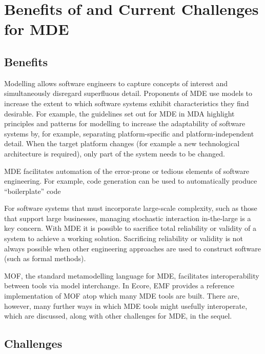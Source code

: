 
\section{Benefits of and Current Challenges for MDE}
\label{sec:mde_benefits_and_challenges}

\subsection{Benefits}
\label{subsec:mde_benefits}
Modelling allows software engineers to capture concepts of interest and simultaneously disregard superfluous detail. Proponents of MDE use models to increase the extent to which software systems exhibit characteristics they find desirable. For example, the guidelines set out for MDE in MDA \cite{mda} highlight principles and patterns for modelling to increase the adaptability of software systems by, for example, separating platform-specific and platform-independent detail. When the target platform changes (for example a new technological architecture is required), only part of the system needs to be changed.

MDE facilitates automation of the error-prone or tedious elements of software engineering. For example, code generation can be used to automatically produce 
``boilerplate'' code %

For software systems that must incorporate large-scale complexity, such as those that support large businesses, managing stochastic interaction in-the-large is a key concern. With MDE it is possible to sacrifice total reliability or validity of a system to achieve a working solution. Sacrificing reliability or validity is not always possible when other engineering approaches are used to construct software (such as formal methods). 

MOF, the standard metamodelling language for MDE, facilitates interoperability between tools via model interchange. In Ecore, EMF provides a reference implementation of MOF atop which many MDE tools are built. There are, however, many further ways in which MDE tools might usefully interoperate, which are discussed, along with other challenges for MDE, in the sequel.

\subsection{Challenges}

